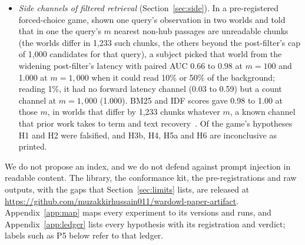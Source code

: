 \begin{itemize}
        an islanded permitted subgraph that we did not measure directly; plans recorded under an exploratory hypothesis tie
        pgvector's two modes to PostgreSQL's plan cache. A count flagged all 2,657 truly short answers
        without a false alarm, which on unchanging data follows from what a count is, but no count sees a full answer of the wrong chunks.
  \item \emph{Side channels of filtered retrieval} (Section~\ref{sec:side}). In a pre-registered forced-choice game, shown one
        query's observation in two worlds and told that in one the query's $m$ nearest non-hub passages are unreadable chunks (the worlds differ in 1,233 such chunks, the others beyond the post-filter's cap of 1,000 candidates for that query), a subject picked
        that world from the widening post-filter's latency with paired AUC 0.66 to 0.98 at $m = 100$ and 1.000 at $m = 1{,}000$ when
        it could read 10\% or 50\% of the background; reading 1\%, it had no forward latency channel (0.03 to 0.59) but a
        count channel at $m = 1{,}000$ (1.000). BM25 and IDF scores gave 0.98 to 1.00 at those $m$, in worlds that differ by 1,233 chunks whatever $m$, a known channel that prior work takes to term and text
        recovery~\cite{wang2017sidechannel,espiritu2026plaintext}. Of
        the game's hypotheses H1 and H2 were falsified, and H3b, H4, H5a and H6 are inconclusive as printed.
\end{itemize}

We do not propose an index, and we do not defend against prompt injection in readable content. The library,
the conformance kit, the pre-registrations and raw outputs, with the gaps that Section~\ref{sec:limits} lists, are released at
\url{https://github.com/muzakkirhussain011/wardowl-paper-artifact}. Appendix~\ref{app:map} maps every experiment to its versions and
runs, and Appendix~\ref{app:ledger} lists every hypothesis with its registration and verdict; labels such as P5 below refer to that ledger.
